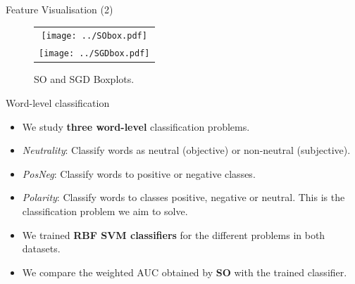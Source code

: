 \documentclass[handout]{beamer}
\begin{document}
\begin{frame}{Feature Visualisation (2)}
\begin{scriptsize}
\begin{figure}[ht]
\begin{center}
\begin{tabular}{c}
\texttt{[image: ../SObox.pdf]}\\
\texttt{[image: ../SGDbox.pdf]}
\end{tabular}
\caption{SO and SGD  Boxplots.}
\label{fig:box}
\end{center}
\end{figure} 
\end{scriptsize}
\end{frame}



\begin{frame}{Word-level classification}
\begin{scriptsize}
\begin{itemize}
\item We study \textbf{three word-level} classification problems.
\item  \emph{Neutrality}: Classify words as neutral (objective) or non-neutral (subjective). 
\item \emph{PosNeg}: Classify words to positive or negative classes. 
\item \emph{Polarity}: Classify words to classes positive, negative or neutral. This is the classification problem we aim to solve. 
\item We trained \textbf{RBF SVM classifiers} for the different problems in both datasets.
\item We compare the weighted AUC obtained by \textbf{SO} with the trained classifier. 
\end{itemize}
\end{scriptsize}

\end{frame}
\end{document}
